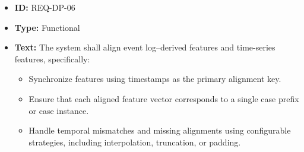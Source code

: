 \documentclass[runningheads]{llncs}
\begin{document}
\begin{itemize}
          \vspace{1em}
    \item \textbf{ID:} REQ-DP-06
    \item \textbf{Type:} Functional
    \item \textbf{Text:} The system shall align event log–derived features and time-series features, specifically:
          \begin{itemize}
              \item Synchronize features using timestamps as the primary alignment key.
              \item Ensure that each aligned feature vector corresponds to a single case prefix or case instance.
              \item Handle temporal mismatches and missing alignments using configurable strategies, including interpolation, truncation, or padding.
          \end{itemize}

\end{itemize}
\end{document}
